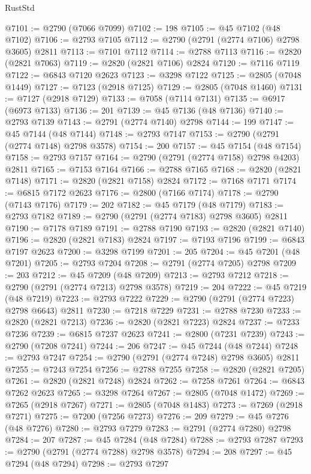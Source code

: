 \begin{lexlean}{RustStd}
\begin{coremodule}
@7101 := @2790 (@7066 @7099)
@7102 := 198
@7105 := @45 @7102 (@48 @7102)
@7106 := @2793 @7105
@7112 := @2790 (@2791 (@2774 @7106) @2798 @3605) @2811
@7113 := @7101 @7112
@7114 := @2788 @7113
@7116 := @2820 (@2821 @7063)
@7119 := @2820 (@2821 @7106) @2824
@7120 := @7116 @7119
@7122 := @6843 @7120 @2623
@7123 := @3298 @7122
@7125 := @2805 (@7048 @1449)
@7127 := @7123 (@2918 @7125)
@7129 := @2805 (@7048 @1460)
@7131 := @7127 (@2918 @7129)
@7133 := @7058 (@7114 @7131)
@7135 := @6917 (@6973 @7133)
@7136 := 201
@7139 := @45 @7136 (@48 @7136)
@7140 := @2793 @7139
@7143 := @2791 (@2774 @7140) @2798
@7144 := 199
@7147 := @45 @7144 (@48 @7144)
@7148 := @2793 @7147
@7153 := @2790 (@2791 (@2774 @7148) @2798 @3578)
@7154 := 200
@7157 := @45 @7154 (@48 @7154)
@7158 := @2793 @7157
@7164 := @2790 (@2791 (@2774 @7158) @2798 @4203) @2811
@7165 := @7153 @7164
@7166 := @2788 @7165
@7168 := @2820 (@2821 @7148)
@7171 := @2820 (@2821 @7158) @2824
@7172 := @7168 @7171
@7174 := @6815 @7172 @2623
@7176 := @2800 (@7166 @7174)
@7178 := @2790 (@7143 @7176)
@7179 := 202
@7182 := @45 @7179 (@48 @7179)
@7183 := @2793 @7182
@7189 := @2790 (@2791 (@2774 @7183) @2798 @3605) @2811
@7190 := @7178 @7189
@7191 := @2788 @7190
@7193 := @2820 (@2821 @7140)
@7196 := @2820 (@2821 @7183) @2824
@7197 := @7193 @7196
@7199 := @6843 @7197 @2623
@7200 := @3298 @7199
@7201 := 205
@7204 := @45 @7201 (@48 @7201)
@7205 := @2793 @7204
@7208 := @2791 (@2774 @7205) @2798
@7209 := 203
@7212 := @45 @7209 (@48 @7209)
@7213 := @2793 @7212
@7218 := @2790 (@2791 (@2774 @7213) @2798 @3578)
@7219 := 204
@7222 := @45 @7219 (@48 @7219)
@7223 := @2793 @7222
@7229 := @2790 (@2791 (@2774 @7223) @2798 @6643) @2811
@7230 := @7218 @7229
@7231 := @2788 @7230
@7233 := @2820 (@2821 @7213)
@7236 := @2820 (@2821 @7223) @2824
@7237 := @7233 @7236
@7239 := @6815 @7237 @2623
@7241 := @2800 (@7231 @7239)
@7243 := @2790 (@7208 @7241)
@7244 := 206
@7247 := @45 @7244 (@48 @7244)
@7248 := @2793 @7247
@7254 := @2790 (@2791 (@2774 @7248) @2798 @3605) @2811
@7255 := @7243 @7254
@7256 := @2788 @7255
@7258 := @2820 (@2821 @7205)
@7261 := @2820 (@2821 @7248) @2824
@7262 := @7258 @7261
@7264 := @6843 @7262 @2623
@7265 := @3298 @7264
@7267 := @2805 (@7048 @1472)
@7269 := @7265 (@2918 @7267)
@7271 := @2805 (@7048 @1483)
@7273 := @7269 (@2918 @7271)
@7275 := @7200 (@7256 @7273)
@7276 := 209
@7279 := @45 @7276 (@48 @7276)
@7280 := @2793 @7279
@7283 := @2791 (@2774 @7280) @2798
@7284 := 207
@7287 := @45 @7284 (@48 @7284)
@7288 := @2793 @7287
@7293 := @2790 (@2791 (@2774 @7288) @2798 @3578)
@7294 := 208
@7297 := @45 @7294 (@48 @7294)
@7298 := @2793 @7297

\end{coremodule}
\end{lexlean}

